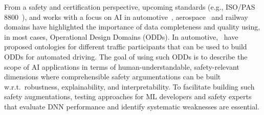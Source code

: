 From a safety and certification perspective, upcoming standards (e.g., ISO/PAS 8800~\citep{ISO8800:2024}), and works with a focus on AI in automotive~\citep{Koopman2019HowMO, burton2022safety}, aerospace~\citep{EASA_concept_paper} and railway~\citep{zeller2023safety} domains have highlighted the importance of data completeness and quality using, in most cases, Operational Design Domains (ODDs). 
In automotive,~\citet{herrmann2022using} have proposed ontologies for different traffic participants that can be used to build ODDs for automated driving.  
The goal of using such ODDs is to describe the scope of AI applications in terms of human-understandable, safety-relevant dimensions where comprehensible safety argumentations can be built w.r.t.\ robustness, explainability, and interpretability.  
To facilitate building such safety augmentations, testing approaches for ML developers and safety experts that evaluate DNN performance and identify systematic weaknesses are essential.



